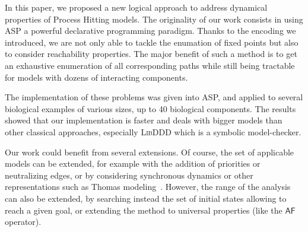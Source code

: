 In this paper, we proposed a new logical approach to address dynamical properties of Process Hitting models. The originality of our work consists in using ASP a powerful declarative programming paradigm. Thanks to the encoding we introduced, we are not only able to tackle the enumation of fixed points but also to consider reachability properties. The major benefit of such a method is to get an exhaustive enumeration of all corresponding paths while still being tractable for models with dozens of interacting components.

The implementation of these problems was given into ASP,
and applied to several biological examples of various sizes, up to
40 biological components.
The results showed that our implementation is faster and deals with bigger models
than other classical approaches, especially \textsc{LibDDD} which is a symbolic model-checker.

Our work could benefit from several extensions.
Of course, the set of applicable models can be extended,
for example with the addition
of priorities or neutralizing edges,
or by considering synchronous dynamics or other representations
such as Thomas modeling~\cite{BernotSemBRN}.
However, the range of the analysis can also be extended,
by searching instead the set of initial states
allowing to reach a given goal,
or extending the method to universal properties (like the $\mathsf{AF}$ operator).
